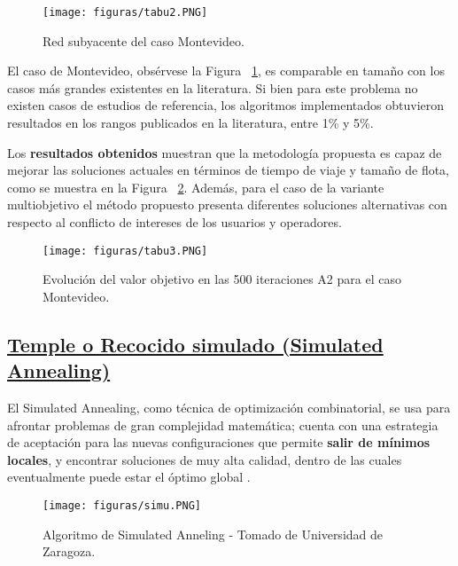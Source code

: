 \documentclass[10pt,conference]{IEEEtran}
\begin{document}
\begin{enumerate}
\begin{figure}[H]
\begin{center}
\texttt{[image: figuras/tabu2.PNG]}
\caption{Red subyacente del caso Montevideo.}
\label{tabu2} 
\end{center}
\end{figure}

El caso de Montevideo, obsérvese la Figura ~\ref{tabu2}, es comparable en tamaño con los casos más grandes existentes en la literatura. Si bien para este problema no existen casos de estudios de referencia, los algoritmos implementados obtuvieron resultados en los rangos publicados en la literatura, entre 1\% y 5\%.

Los \textbf{resultados obtenidos} muestran que la metodología propuesta es capaz de mejorar las soluciones actuales en términos de tiempo de viaje y tamaño de flota, como se muestra en la Figura ~\ref{tabu3}. Además, para el caso de la variante multiobjetivo el método propuesto presenta diferentes soluciones alternativas con respecto al conflicto de intereses de los usuarios y operadores.

\begin{figure}[H]
\begin{center}
\texttt{[image: figuras/tabu3.PNG]}
\caption{Evolución del valor objetivo en las 500 iteraciones A2 para el caso Montevideo.}
\label{tabu3} 
\end{center}
\end{figure}
\end{enumerate} 
\subsection{\underline{\textbf{Temple o Recocido simulado (Simulated Annealing)}}}

El Simulated Annealing, como técnica de optimización combinatorial, se usa para afrontar problemas de gran complejidad matemática; cuenta con una estrategia de aceptación para las nuevas configuraciones que permite \textbf{salir de mínimos locales}, y encontrar soluciones de muy alta calidad, dentro de las cuales eventualmente puede estar el óptimo global \citep{anne}.

\begin{figure}[H]
\begin{center}
\texttt{[image: figuras/simu.PNG]}
\caption{Algoritmo de Simulated Anneling - Tomado de Universidad de Zaragoza.}
\label{simu} 
\end{center}
\end{figure}
\end{document}
